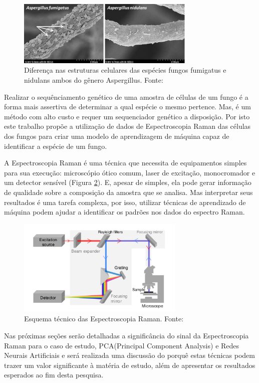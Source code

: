 \documentclass[conference,peerreview]{IEEEtran}
\begin{document}
\begin{figure}[ht]
\centering
\includegraphics[width=8.5cm]{fungus_dif}
\caption{Diferença nas estruturas celulares das espécies fungos fumigatus e nidulans ambos do gênero Aspergillus. Fonte: \cite{Lee2015}}
\label{fungus_dif}
\end{figure}

Realizar o sequênciamento genético de uma amostra de células de um fungo é a forma mais assertiva de determinar a qual espécie o mesmo pertence. Mas, é um método com alto custo e requer um sequenciador genético a disposição. Por isto este trabalho propõe a utilização de dados de Espectroscopia Raman das células dos fungos para criar uma modelo de aprendizagem de máquina capaz de identificar a espécie de um fungo.

A Espectroscopia Raman é uma técnica que necessita de equipamentos simples para sua execução: microscópio ótico comum, laser de excitação, monocromador e um detector sensível (Figura \ref{esquema_experimento}). E, apesar de simples, ela pode gerar informação de qualidade sobre a composição da amostra que se analisa. Mas interpretar seus resultados é uma tarefa complexa, por isso, utilizar técnicas de aprendizado de máquina podem ajudar a identificar os padrões nos dados do espectro Raman.

\begin{figure}[ht]
\centering
\includegraphics[width=8cm]{esquema_experimento}
\caption{Esquema técnico das Espectroscopia Raman. Fonte: \cite{Butler2016}}
\label{esquema_experimento}
\end{figure}

Nas próximas seções serão detalhadas a significância do sinal da Espectroscopia Raman para o caso de estudo, PCA(Principal Component Analysis) e Redes Neurais Artificiais e será realizada uma discussão do porquê estas técnicas podem trazer um valor significante à matéria de estudo, além de apresentar os resultados esperados ao fim desta pesquisa.
\end{document}

